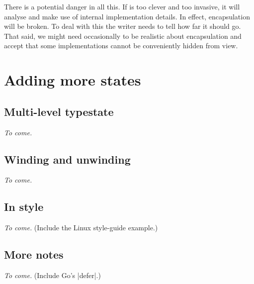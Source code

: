 \documentclass[10pt]{amsart}
\begin{document}
There is a potential danger in all this.  If \Utop is too clever and
too invasive, it will analyse and make use of internal implementation
details.  In effect, encapsulation will be broken.  To deal with this
the writer needs to tell \Utop how far it should go.  That said, we
might need occasionally to be realistic about encapsulation and accept
that some implementations cannot be conveniently hidden from view.


\section{Adding more states}

\label{sec:moreStates}

\subsection{Multi-level typestate}

\label{sec:multiLevel}%

\emph{To come.}

\subsection{Winding and unwinding}

\label{sec:unwind}%

\emph{To come.}

\subsection{In style}

\emph{To come.}  (Include the Linux style-guide example.)

\subsection{More notes}

\emph{To come.}  (Include Go's |defer|.)





\addtocounter{section}{1}


\end{document}
